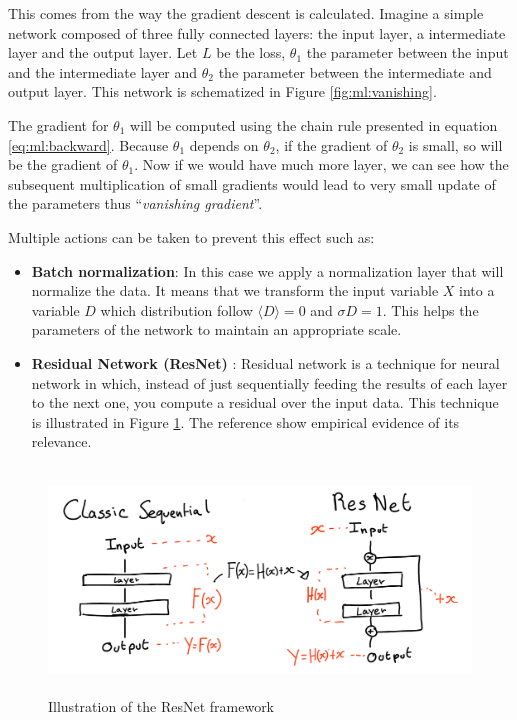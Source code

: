 \documentclass[../main.tex]{subfiles}
\begin{document}
This comes from the way the gradient descent is calculated. Imagine a simple network composed of three fully connected layers: the input layer, a intermediate layer and the output layer. Let $L$ be the loss, $\theta_1$ the parameter between the input and the intermediate layer and $\theta_2$ the parameter between the intermediate and output layer. This network is schematized in Figure \ref{fig:ml:vanishing}.

The gradient for $\theta_1$ will be computed using the chain rule presented in equation \ref{eq:ml:backward}. Because $\theta_1$ depends on $\theta_2$, if the gradient of $\theta_2$ is small, so will be the gradient of $\theta_1$. Now if we would have much more layer, we can see how the subsequent multiplication of small gradients would lead to very small update of the parameters thus ``\textit{vanishing gradient}''.

Multiple actions can be taken to prevent this effect such as:
\begin{itemize}
  \item \textbf{Batch normalization}: In this case we apply a normalization layer that will normalize the data. It means that we transform the input variable $X$ into a variable $D$ which distribution follow $\langle D \rangle = 0$ and $\sigma D = 1$. This helps the parameters of the network to maintain an appropriate scale.
  \item \textbf{Residual Network (ResNet)} \cite{he_deep_2016}: Residual network is a technique for neural network in which, instead of just sequentially feeding the results of each layer to the next one, you compute a residual over the input data. This technique is illustrated in Figure \ref{fig:ml:resnet}. The reference \cite{he_deep_2016} show empirical evidence of its relevance.
\end{itemize}


\begin{figure}[ht]
  \centering
  \includegraphics[height=6cm]{images/ml/resnet.png}
  \caption{Illustration of the ResNet framework}
  \label{fig:ml:resnet}
\end{figure}
\end{document}
